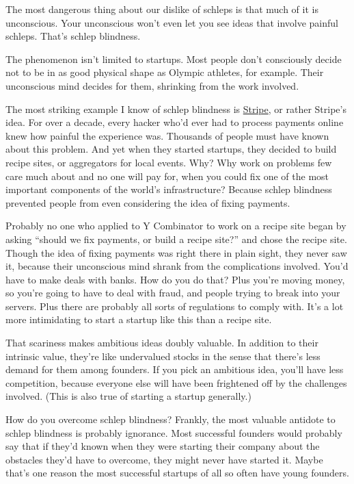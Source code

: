 \documentclass[12pt]{book}
\begin{document}
The most dangerous thing about our dislike of schleps is that much of it
is unconscious. Your unconscious won't even let you see ideas that
involve painful schleps. That's schlep blindness.

The phenomenon isn't limited to startups. Most people don't consciously
decide not to be in as good physical shape as Olympic athletes, for
example. Their unconscious mind decides for them, shrinking from the
work involved.

The most striking example I know of schlep blindness is
\href{http://stripe.com}{Stripe}, or rather Stripe's idea. For over a
decade, every hacker who'd ever had to process payments online knew how
painful the experience was. Thousands of people must have known about
this problem. And yet when they started startups, they decided to build
recipe sites, or aggregators for local events. Why? Why work on problems
few care much about and no one will pay for, when you could fix one of
the most important components of the world's infrastructure? Because
schlep blindness prevented people from even considering the idea of
fixing payments.

Probably no one who applied to Y Combinator to work on a recipe site
began by asking ``should we fix payments, or build a recipe site?'' and
chose the recipe site. Though the idea of fixing payments was right
there in plain sight, they never saw it, because their unconscious mind
shrank from the complications involved. You'd have to make deals with
banks. How do you do that? Plus you're moving money, so you're going to
have to deal with fraud, and people trying to break into your servers.
Plus there are probably all sorts of regulations to comply with. It's a
lot more intimidating to start a startup like this than a recipe site.

That scariness makes ambitious ideas doubly valuable. In addition to
their intrinsic value, they're like undervalued stocks in the sense that
there's less demand for them among founders. If you pick an ambitious
idea, you'll have less competition, because everyone else will have been
frightened off by the challenges involved. (This is also true of
starting a startup generally.)

How do you overcome schlep blindness? Frankly, the most valuable
antidote to schlep blindness is probably ignorance. Most successful
founders would probably say that if they'd known when they were starting
their company about the obstacles they'd have to overcome, they might
never have started it. Maybe that's one reason the most successful
startups of all so often have young founders.
\end{document}

